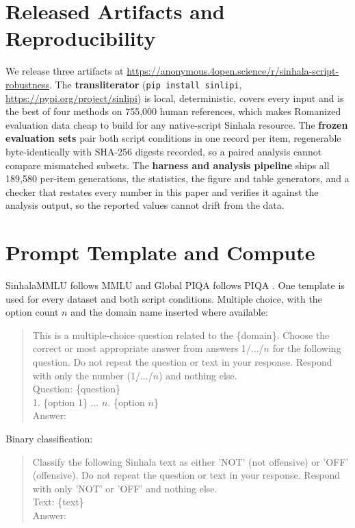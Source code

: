 \documentclass[11pt]{article}
\newcommand{\pkg}{\texttt{sinlipi}}
\newcommand{\anonrepo}{\url{https://anonymous.4open.science/r/sinhala-script-robustness}}
\newcommand{\pkgurl}{\url{https://pypi.org/project/sinlipi}}
\begin{document}
\section{Released Artifacts and Reproducibility}
\label{sec:artifacts}

We release three artifacts at \anonrepo. The \textbf{transliterator}
(\texttt{pip install \pkg}, \pkgurl) is local, deterministic, covers every input and is
the best of four methods on 755{,}000 human references, which makes Romanized
evaluation data cheap to build for any native-script Sinhala resource. The
\textbf{frozen evaluation sets} pair both script conditions in one record per item,
regenerable byte-identically with SHA-256 digests recorded, so a paired analysis cannot
compare mismatched subsets. The \textbf{harness and analysis pipeline} ships all
189{,}580 per-item generations, the statistics, the figure and table generators, and a
checker that restates every number in this paper and verifies it against the analysis
output, so the reported values cannot drift from the data.

\section{Prompt Template and Compute}
\label{sec:prompts}

SinhalaMMLU follows MMLU \citep{hendrycks-etal-2021-mmlu} and Global PIQA follows PIQA
\citep{bisk-etal-2020-piqa}. One template is used for every dataset and both script
conditions. Multiple choice, with the option count $n$ and the domain name inserted where
available:

\begin{quote}\small\ttfamily
This is a multiple-choice question related to the \{domain\}. Choose the correct or
most appropriate answer from answers 1/.../$n$ for the following question. Do not
repeat the question or text in your response. Respond with only the number
(1/.../$n$) and nothing else.\\
Question: \{question\}\\
1. \{option 1\} ... $n$. \{option $n$\}\\
Answer:
\end{quote}

Binary classification:

\begin{quote}\small\ttfamily
Classify the following Sinhala text as either 'NOT' (not offensive) or 'OFF'
(offensive). Do not repeat the question or text in your response. Respond with only
'NOT' or 'OFF' and nothing else.\\
Text: \{text\}\\
Answer:
\end{quote}
\end{document}
